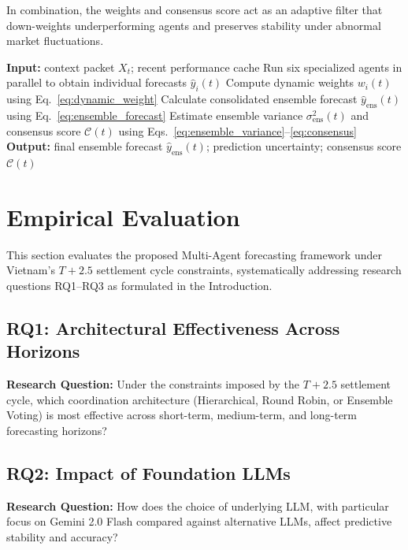 \documentclass{ieeeaccess}
\begin{document}
In combination, the weights and consensus score act as an adaptive filter that down-weights underperforming agents and preserves stability under abnormal market fluctuations.

    \begin{algorithmic}[1]
    \STATE \textbf{Input:} context packet $X_t$; recent performance cache
    \STATE Run six specialized agents in parallel to obtain individual forecasts $\hat{y}_i(t)$
    \STATE Compute dynamic weights $w_i(t)$ using Eq.~\eqref{eq:dynamic_weight}
    \STATE Calculate consolidated ensemble forecast $\hat{y}_{\text{ens}}(t)$ using Eq.~\eqref{eq:ensemble_forecast}
    \STATE Estimate ensemble variance $\sigma^2_{\text{ens}}(t)$ and consensus score $\mathcal{C}(t)$ using Eqs.~\eqref{eq:ensemble_variance}--\eqref{eq:consensus}
    \STATE \textbf{Output:} final ensemble forecast $\hat{y}_{\text{ens}}(t)$; prediction uncertainty; consensus score $\mathcal{C}(t)$
    \end{algorithmic}







\section{Empirical Evaluation}

This section evaluates the proposed Multi-Agent forecasting framework under Vietnam's $T+2.5$ settlement cycle constraints, systematically addressing research questions RQ1–RQ3 as formulated in the Introduction.

\subsection{RQ1: Architectural Effectiveness Across Horizons}

\textbf{Research Question:} Under the constraints imposed by the $T+2.5$ settlement cycle, which coordination architecture (Hierarchical, Round Robin, or Ensemble Voting) is most effective across short-term, medium-term, and long-term forecasting horizons?


\subsection{RQ2: Impact of Foundation LLMs}

\textbf{Research Question:} How does the choice of underlying LLM, with particular focus on Gemini 2.0 Flash compared against alternative LLMs, affect predictive stability and accuracy?
\end{document}
